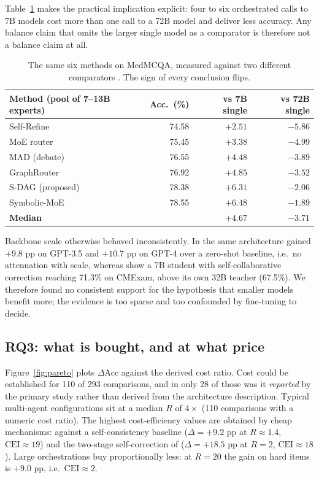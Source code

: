 \documentclass[11pt,a4paper]{article}
\begin{document}
Table~\ref{tab:sdag} makes the practical implication explicit: four to six orchestrated
calls to 7B models cost more than one call to a 72B model and deliver less accuracy. Any
balance claim that omits the larger single model as a comparator is therefore not a balance
claim at all.

\begin{table}[ht]\centering\small
\caption{The same six methods on MedMCQA, measured against two different comparators
\citep{wang2511}. The sign of every conclusion flips.}
\label{tab:sdag}
\begin{tabular}{lrrr}
\toprule
Method (pool of 7--13B experts) & Acc.\ (\%) & vs 7B single & vs 72B single \\
\midrule
Self-Refine      & 74.58 & $+2.51$ & $-5.86$ \\
MoE router       & 75.45 & $+3.38$ & $-4.99$ \\
MAD (debate)     & 76.55 & $+4.48$ & $-3.89$ \\
GraphRouter      & 76.92 & $+4.85$ & $-3.52$ \\
S-DAG (proposed) & 78.38 & $+6.31$ & $-2.06$ \\
Symbolic-MoE     & 78.55 & $+6.48$ & $-1.89$ \\
\midrule
\textbf{Median}  &       & $\mathbf{+4.67}$ & $\mathbf{-3.71}$ \\
\bottomrule
\end{tabular}
\end{table}

Backbone scale otherwise behaved inconsistently. In \citet{tang2311} the same architecture gained
$+9.8$ pp on GPT-3.5 and $+10.7$ pp on GPT-4 over a zero-shot baseline, i.e.\ no attenuation
with scale, whereas \citet{su2509} show a 7B student with self-collaborative correction
reaching 71.3\% on CMExam, above its own 32B teacher (67.5\%). We therefore found no
consistent support for the hypothesis that smaller models benefit more; the evidence is
too sparse and too confounded by fine-tuning to decide.

\subsection{RQ3: what is bought, and at what price}
Figure~\ref{fig:pareto} plots $\Delta$Acc against the derived cost ratio. Cost could be
established for 110 of 293 comparisons, and in only 28 of those was it \emph{reported} by the
primary study rather than derived from the architecture description.
Typical multi-agent configurations sit at a median $R$ of $4\times$ (110 comparisons with a numeric cost ratio). The highest
cost-efficiency values are obtained by cheap mechanisms: \citet{tang2311} against a
self-consistency baseline ($\Delta=+9.2$ pp at $R\approx1.4$, $\mathrm{CEI}\approx19$) and
the two-stage self-correction of \citet{su2509} ($\Delta=+18.5$ pp at $R=2$,
$\mathrm{CEI}\approx18$). Large orchestrations buy proportionally less: at $R=20$ the
gain on hard items is $+9.0$ pp, i.e.\ $\mathrm{CEI}\approx2$.
\end{document}
